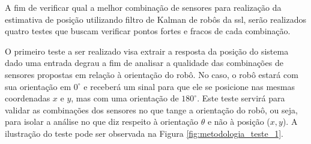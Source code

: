 \documentclass[acronym, symbols, table]{fei}
\begin{document}
		A fim de verificar qual a melhor combinação de sensores para realização da estimativa de posição utilizando filtro de Kalman de robôs da \acrshort{ssl}, serão realizados quatro testes que buscam verificar pontos fortes e fracos de cada combinação.
		
		O primeiro teste a ser realizado visa extrair a resposta da posição do sistema dado uma entrada degrau a fim de analisar a qualidade das combinações de sensores propostas em relação à orientação do robô. No caso, o robô estará com sua orientação em $0^\circ$ e receberá um sinal para que ele se posicione nas mesmas coordenadas $x$ e $y$, mas com uma orientação de $180^\circ$. Este teste servirá para validar as combinações dos sensores no que tange a orientação do robô, ou seja, para isolar a análise no que diz respeito à orientação $\theta$ e não à posição ($x, y$). A ilustração do teste pode ser observada na Figura \ref{fig:metodologia_teste_1}.
		
\end{document}
